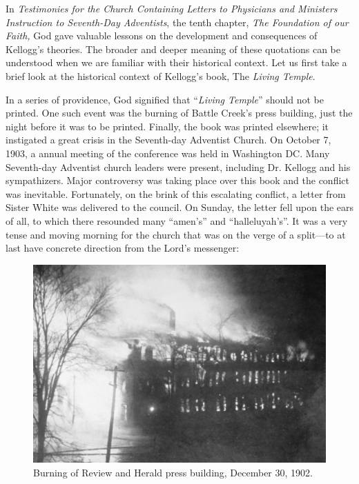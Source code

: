 
In \textit{Testimonies for the Church Containing Letters to Physicians and Ministers Instruction to Seventh-Day Adventists}, the tenth chapter, \textit{The Foundation of our Faith,} God gave valuable lessons on the development and consequences of Kellogg's theories. The broader and deeper meaning of these quotations can be understood when we are familiar with their historical context. Let us first take a brief look at the historical context of Kellogg's book, The \textit{Living Temple}.

In a series of providence, God signified that “\textit{Living Temple}” should not be printed. One such event was the burning of Battle Creek's press building, just the night before it was to be printed. Finally, the book was printed elsewhere; it instigated a great crisis in the Seventh-day Adventist Church. On October 7, 1903, a annual meeting of the conference was held in Washington DC. Many Seventh-day Adventist church leaders were present, including Dr. Kellogg and his sympathizers. Major controversy was taking place over this book and the conflict was inevitable. Fortunately, on the brink of this escalating conflict, a letter from Sister White was delivered to the council. On Sunday, the letter fell upon the ears of all, to which there resounded many “amen's” and “halleluyah's”. It was a very tense and moving morning for the church that was on the verge of a split—to at last have concrete direction from the Lord's messenger:

\begin{figure}[h]
    \centering
    \includegraphics[width=1\linewidth]{images/review-and-herlad.jpg}
    \caption*{Burning of Review and Herald press building, December 30, 1902.}
    \label{fig:review-and-herald}
\end{figure}

